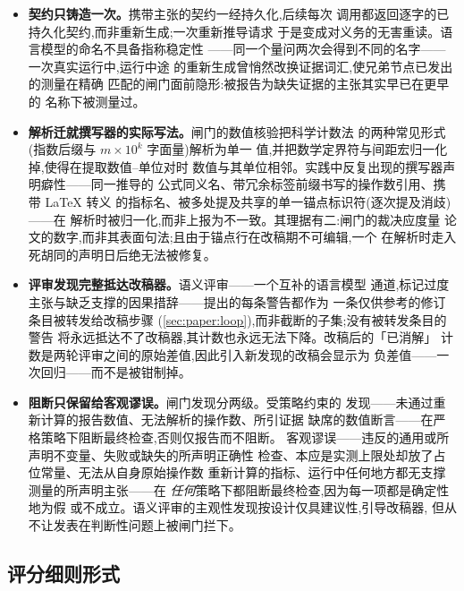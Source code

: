 \begin{itemize}
  \item \textbf{契约只铸造一次。}携带主张的契约一经持久化,后续每次
        调用都返回逐字的已持久化契约,而非重新生成;一次重新推导请求
        于是变成对义务的无害重读。语言模型的命名不具备指称稳定性
        ——同一个量问两次会得到不同的名字——一次真实运行中,运行中途
        的重新生成曾悄然改换证据词汇,使兄弟节点已发出的测量在精确
        匹配的闸门面前隐形:被报告为缺失证据的主张其实早已在更早的
        名称下被测量过。
  \item \textbf{解析迁就撰写器的实际写法。}闸门的数值核验把科学计数法
        的两种常见形式(指数后缀与 $m \times 10^{k}$ 字面量)解析为单一
        值,并把数学定界符与间距宏归一化掉,使得在提取数值--单位对时
        数值与其单位相邻。实践中反复出现的撰写器声明癖性——同一推导的
        公式同义名、带冗余标签前缀书写的操作数引用、携带 \LaTeX{} 转义
        的指标名、被多处提及共享的单一锚点标识符(逐次提及消歧)——在
        解析时被归一化,而非上报为不一致。其理据有二:闸门的裁决应度量
        论文的数字,而非其表面句法;且由于锚点行在改稿期不可编辑,一个
        在解析时走入死胡同的声明日后绝无法被修复。
  \item \textbf{评审发现完整抵达改稿器。}语义评审——一个互补的语言模型
        通道,标记过度主张与缺乏支撑的因果措辞——提出的每条警告都作为
        一条仅供参考的修订条目被转发给改稿步骤
        (\cref{sec:paper:loop}),而非截断的子集;没有被转发条目的警告
        将永远抵达不了改稿器,其计数也永远无法下降。改稿后的「已消解」
        计数是两轮评审之间的原始差值,因此引入新发现的改稿会显示为
        负差值——一次回归——而不是被钳制掉。
  \item \textbf{阻断只保留给客观谬误。}闸门发现分两级。受策略约束的
        发现——未通过重新计算的报告数值、无法解析的操作数、所引证据
        缺席的数值断言——在严格策略下阻断最终检查,否则仅报告而不阻断。
        客观谬误——违反的通用或所声明不变量、失败或缺失的所声明正确性
        检查、本应是实测上限处却放了占位常量、无法从自身原始操作数
        重新计算的指标、运行中任何地方都无支撑测量的所声明主张——在
        \emph{任何}策略下都阻断最终检查,因为每一项都是确定性地为假
        或不成立。语义评审的主观性发现按设计仅具建议性,引导改稿器,
        但从不让发表在判断性问题上被闸门拦下。
\end{itemize}

\subsection{评分细则形式}\label{sec:paper:rubric}

